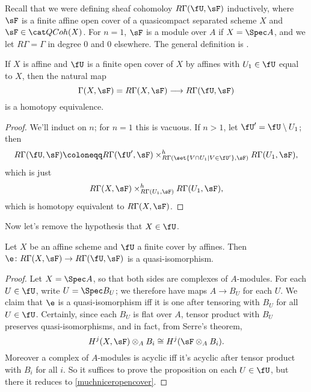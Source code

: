 
Recall that we were defining sheaf cohomoloy $R\Gamma(\fU, \sF)$ inductively, where $\sF$ is a finite affine open cover of a quasicompact separated scheme $X$ and $\sF\in\QCoh(X)$. For $n = 1$, $\sF$ is a module over $A$ if $X = \Spec A$, and we let $R\Gamma = \Gamma$ in degree $0$ and $0$ elsewhere. The general definition is \TODO.
\begin{lem}
\label{muchniceropencover}
If $X$ is affine and $\fU$ is a finite open cover of $X$ by affines with $U_1\in\fU$ equal to $X$, then the natural map
\begin{equation}
	\Gamma(X,\sF) = R\Gamma(X,\sF)\longrightarrow R\Gamma(\fU, \sF)
\end{equation}
is a homotopy equivalence.
\end{lem}
\begin{proof}
We'll induct on $n$; for $n = 1$ this is vacuous. If $n > 1$, let $\fU' = \fU\setminus U_1$; then
\begin{equation}
	R\Gamma(\fU, \sF)\coloneqq R\Gamma(\fU',\sF)\times^h_{R\Gamma(\set{V\cap U_1\mid V\in\fU'}, \sF)} R\Gamma(U_1, \sF),
\end{equation}
which is just
\begin{equation}
	R\Gamma(X,\sF)\times^h_{R\Gamma(U_1, \sF)} R\Gamma(U_1,\sF),
\end{equation}
which is homotopy equivalent to $R\Gamma(X,\sF)$.
\end{proof}
Now let's remove the hypothesis that $X\in\fU$.
\begin{prop}
\label{affineaffinecech}
Let $X$ be an affine scheme and $\fU$ a finite cover by affines. Then $\e\colon R\Gamma(X,\sF)\to R\Gamma(\fU, \sF)$ is a quasi-isomorphism.
\end{prop}
\begin{proof}
Let $X = \Spec A$, so that both sides are complexes of $A$-modules. For each $U\in\fU$, write $U = \Spec B_U$; we therefore have maps $A\to B_U$ for each $U$. We claim that $\e$ is a quasi-isomorphism iff it is one after tensoring with $B_U$ for all $U\in\fU$. Certainly, since each $B_U$ is flat over $A$, tensor product with $B_U$ preserves quasi-isomorphisms, and in fact, from Serre's theorem,
\begin{equation}
	H^j(X,\sF)\otimes_A B_i\cong H^j(\sF\otimes_A B_i).
\end{equation}
Moreover a complex of $A$-modules is acyclic iff it's acyclic after tensor product with $B_i$ for all $i$. So it suffices to prove the proposition on each $U\in\fU$, but there it reduces to \cref{muchniceropencover}.
\end{proof}
